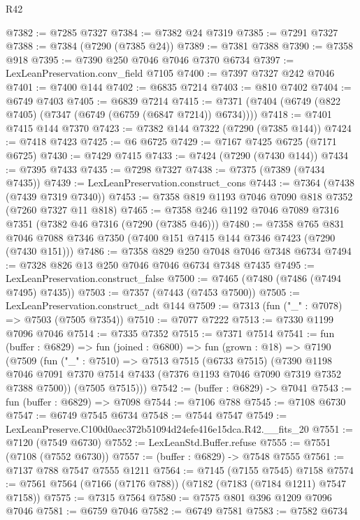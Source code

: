 \begin{lexlean}{R42}
\begin{coremodule}
{@7382 := @7285 @7327
@7384 := @7382 @24 @7319
@7385 := @7291 @7327
@7388 := @7384 (@7290 (@7385 @24))
@7389 := @7381 @7388
@7390 := @7358 @918
@7395 := @7390 @250 @7046 @7046 @7370 @6734
@7397 := LexLeanPreservation.conv_field @7105
@7400 := @7397 @7327 @242 @7046
@7401 := @7400 @144
@7402 := @6835 @7214
@7403 := @810 @7402
@7404 := @6749 @7403
@7405 := @6839 @7214
@7415 := @7371 (@7404 (@6749 (@822 @7405) (@7347 (@6749 (@6759 (@6847 @7214)) @6734))))
@7418 := @7401 @7415 @144 @7370
@7423 := @7382 @144 @7322 (@7290 (@7385 @144))
@7424 := @7418 @7423
@7425 := @6 @6725
@7429 := @7167 @7425 @6725 (@7171 @6725)
@7430 := @7429 @7415
@7433 := @7424 (@7290 (@7430 @144))
@7434 := @7395 @7433
@7435 := @7298 @7327
@7438 := @7375 (@7389 (@7434 @7435))
@7439 := LexLeanPreservation.construct_cons
@7443 := @7364 (@7438 (@7439 @7319 @7340))
@7453 := @7358 @819 @1193 @7046 @7090 @818 @7352 (@7260 @7327 @11 @818)
@7465 := @7358 @246 @1192 @7046 @7089 @7316 @7351 (@7382 @46 @7316 (@7290 (@7385 @46)))
@7480 := @7358
    @765
    @831
    @7046
    @7088
    @7346
    @7350
    (@7400 @151 @7415 @144 @7346 @7423 (@7290 (@7430 @151)))
@7486 := @7358 @829 @250 @7048 @7046 @7348 @6734
@7494 := @7328 @826 @13 @250 @7046 @7046 @6734 @7348 @7435
@7495 := LexLeanPreservation.construct_false
@7500 := @7465 (@7480 (@7486 (@7494 @7495) @7435))
@7503 := @7357 (@7443 (@7453 @7500))
@7505 := LexLeanPreservation.construct_adt @144
@7509 := @7313 (fun ("_" : @7078) => @7503 (@7505 @7354))
@7510 := @7077 @7222
@7513 := @7330 @1199 @7096 @7046
@7514 := @7335 @7352
@7515 := @7371 @7514
@7541 := fun (buffer : @6829) =>
  fun (joined : @6800) =>
  fun (grown : @18) =>
  @7190
    (@7509
      (fun ("_" : @7510) =>
      @7513
        @7515
        (@6733 @7515)
        (@7390
          @1198
          @7046
          @7091
          @7370
          @7514
          @7433
          (@7376 @1193 @7046 @7090 @7319 @7352 @7388 @7500))
        (@7505 @7515)))
@7542 := (buffer : @6829) -> @7041
@7543 := fun (buffer : @6829) => @7098
@7544 := @7106 @788
@7545 := @7108 @6730
@7547 := @6749 @7545 @6734
@7548 := @7544 @7547
@7549 := LexLeanPreserve.C100d0aec372b51094d24efe416e15dca.R42.__fits_20
@7551 := @7120 (@7549 @6730)
@7552 := LexLeanStd.Buffer.refuse
@7555 := @7551 (@7108 (@7552 @6730))
@7557 := (buffer : @6829) -> @7548 @7555
@7561 := @7137 @788 @7547 @7555 @1211
@7564 := @7145 (@7155 @7545) @7158
@7574 := @7561 @7564 (@7166 (@7176 @788)) (@7182 (@7183 (@7184 @1211) @7547 @7158))
@7575 := @7315 @7564
@7580 := @7575 @801 @396 @1209 @7096 @7046
@7581 := @6759 @7046
@7582 := @6749 @7581
@7583 := @7582 @6734
}
\end{coremodule}
\end{lexlean}
